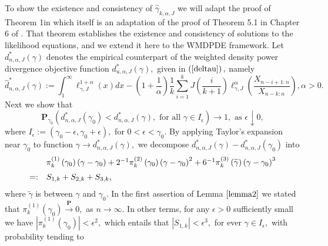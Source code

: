 \documentclass[12pt,reqno,openbib,runningheads,a4paper,portrait]{amsart}%
\begin{document}
To show the existence and consistency of $\widehat{\gamma}_{k,\alpha,J}$ we
will adapt the proof of Theorem 1in \cite{DGG13} which itself is an adaptation
of the proof of Theorem 5.1 in Chapter 6 of \cite{LC98}. That theorem
establishes the existence and consistency of solutions to the likelihood
equations, and we extend it here to the WMDPDE framework. Let $d_{n,\alpha
,J}^{\ast}\left(  \gamma\right)  $ denotes the empirical counterpart of the
weighted density power divergence objective function $d_{u,\alpha,J}^{\ast
}\left(  \gamma\right)  ,$ given in $\left(  \ref{deltau}\right)  ,$ namely
\[
\widehat{d}_{n,\alpha,J}^{\ast}\left(  \gamma\right)  :=\int_{1}^{\infty}%
\ell_{\gamma,J}^{1+\alpha}\left(  x\right)  dx-\left(  1+\dfrac{1}{\alpha
}\right)  \frac{1}{k}\sum_{i=1}^{k}J\left(  \dfrac{i}{k+1}\right)
\ell_{\gamma,J}^{\alpha}\left(  \frac{X_{n-i+1:n}}{X_{n-k:n}}\right)  ,\text{
}\alpha>0.
\]
Next we show that
\begin{equation}
\mathbf{P}_{\gamma_{0}}\left(  d_{n,\alpha,J}^{\ast}\left(  \gamma_{0}\right)
<d_{n,\alpha,J}^{\ast}\left(  \gamma\right)  ,\text{ for all }\gamma\in
I_{\epsilon}\right)  \rightarrow1,\text{ as }\epsilon\downarrow0, \label{P}%
\end{equation}
where $I_{\epsilon}:=\left(  \gamma_{0}-\epsilon,\gamma_{0}+\epsilon\right)
,$ for $0<\epsilon<\gamma_{0}.$ By applying Taylor's expansion near
$\gamma_{0}$ to function $\gamma\rightarrow d_{n,\alpha,J}^{\ast}\left(
\gamma\right)  ,$ we decompose $d_{n,\alpha,J}^{\ast}\left(  \gamma\right)
-d_{n,\alpha,J}^{\ast}\left(  \gamma_{0}\right)  $ into%
\[%
\begin{array}
[c]{ll}
& \pi_{k}^{\left(  1\right)  }\left(  \gamma_{0}\right)  \left(  \gamma
-\gamma_{0}\right)  +2^{-1}\pi_{k}^{\left(  2\right)  }\left(  \gamma
_{0}\right)  \left(  \gamma-\gamma_{0}\right)  ^{2}+6^{-1}\pi_{k}^{\left(
3\right)  }\left(  \widetilde{\gamma}\right)  \left(  \gamma-\gamma
_{0}\right)  ^{3}\medskip\\
=: & S_{1,k}+S_{2,k}+S_{3,k},
\end{array}
\]
where $\widetilde{\gamma}$ is between $\gamma$ and $\gamma_{0}.$ In the first
assertion of Lemma $\ref{lemma2}$ we stated that $\pi_{k}^{\left(  1\right)
}\left(  \gamma_{0}\right)  \overset{\mathbf{P}}{\rightarrow}0,$ as
$n\rightarrow\infty.$ In other terms, for any $\epsilon>0$ sufficiently small
we have $\left\vert \pi_{k}^{\left(  1\right)  }\left(  \gamma_{0}\right)
\right\vert <\epsilon^{2},$ which entails that $\left\vert S_{1,k}\right\vert
<\epsilon^{3},$ for ever $\gamma\in I_{\epsilon},$ with probability tending to
\end{document}
